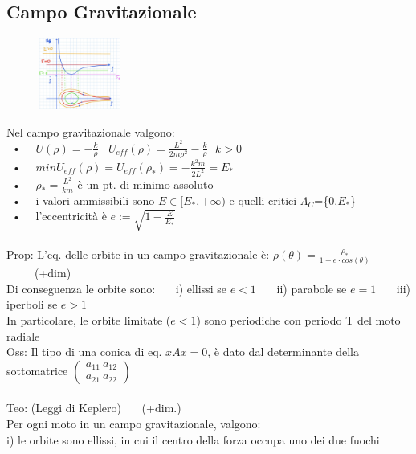 \documentclass{article}
\theoremstyle{unnumbered}
\theoremstyle{unnumbered1}
\begin{document}

\subsection{Campo Gravitazionale}
%
\begin{figure}
\includegraphics[width=0.24\textwidth]{CampoGravitazionale.jpeg}
\end{figure}
Nel campo gravitazionale valgono:\\
\ • \ \ $U(\rho)=-\frac{k}{\rho} \ \ \ \ U_{eff}(\rho)=\frac{L^2}{2m\rho^2}-\frac{k}{\rho} \ \ \ k>0$\\
\ • \ \ $min U_{eff}(\rho)=U_{eff}(\rho_*)=-\frac{k^2m}{2L^2}=E_*$\\
\ • \ \ $\rho_*=\frac{L^2}{km}$  è un pt.\! di minimo assoluto \\
\ • \ \ i valori ammissibili sono $E\in[E_*,+\infty)$ e quelli critici $\Lambda_C$=\{0,$E_*$\}\\
\ • \ \ l'eccentricità è $e:=\sqrt{1-\frac{E}{E_*}}$\\ \\
%
%
%
Prop: L'eq.\! delle orbite in un campo gravitazionale è:  $\rho(\theta)=\frac{\rho_*}{1+e\cdot cos(\theta)}$ \ \ \ \ \ (+dim)\\
\phantom{Prop: }Di conseguenza le orbite sono: \ \ \ i) ellissi se $e<1$ \ \ \ ii) parabole se $e=1$ \ \ \ iii) iperboli se $e>1$\\
\phantom{Prop: }In particolare, le orbite limitate ($e<1$) sono periodiche con periodo T del moto radiale \\
Oss: Il tipo di una conica di eq. $\overline{x}A\overline{x}=0$,    è dato dal determinante della sottomatrice $\begin{pmatrix}a_{11} \ a_{12} \\ a_{21} \ a_{22}\end{pmatrix}$  \\ \\
%
%
%
Teo: (Leggi di Keplero) \ \ \ (+dim.)\\
Per ogni moto in un campo gravitazionale, valgono:\\
i) le orbite sono ellissi, in cui il centro della forza occupa uno dei due fuochi\\
\end{document}
